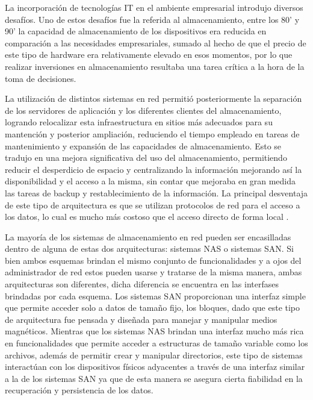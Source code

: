 \documentclass[a4paper,10pt]{article}
\begin{document}
	La incorporación de tecnologías IT en el ambiente empresarial introdujo diversos desafíos. Uno de estos desafíos fue la referida al almacenamiento, entre los 80’ y 90’ la capacidad de almacenamiento de los dispositivos era reducida en comparación a las necesidades empresariales, sumado al hecho de que el precio de este tipo de hardware era relativamente elevado en esos momentos, por lo que realizar inversiones en almacenamiento resultaba una tarea crítica a la hora de la toma de decisiones.
	
	La utilización de distintos sistemas en red permitió posteriormente la separación de los servidores de aplicación y los diferentes clientes del almacenamiento, logrando relocalizar esta infraestructura en sitios más adecuados para su mantención y posterior ampliación, reduciendo el tiempo empleado en tareas de mantenimiento y expansión de las capacidades de almacenamiento. Esto se tradujo en una mejora significativa del uso del almacenamiento, permitiendo reducir el desperdicio de espacio y centralizando la información mejorando así la disponibilidad y el acceso a la misma, sin contar que mejoraba en gran medida las tareas de backup y restablecimiento de la información. La principal desventaja de este tipo de arquitectura es que se utilizan protocolos de red para el acceso a los datos, lo cual es mucho más costoso que el acceso directo de forma local \citep{Gibson_Van_Meter_2000}.
	
	La mayoría de los sistemas de almacenamiento en red pueden ser encasilladas dentro de alguna de estas dos arquitecturas: sistemas NAS o sistemas SAN. Si bien ambos esquemas brindan el mismo conjunto de funcionalidades y a ojos del administrador de red estos pueden usarse y tratarse de la misma manera, ambas arquitecturas son diferentes, dicha diferencia se encuentra en las interfases brindadas por cada esquema. Los sistemas SAN proporcionan una interfaz simple que permite acceder solo a datos de tamaño fijo, los bloques, dado que este tipo de arquitectura fue pensada y diseñada para manejar y manipular medios magnéticos. Mientras que los sistemas NAS brindan una interfaz mucho más rica en funcionalidades que permite acceder a estructuras de tamaño variable como los archivos, además de permitir crear y manipular directorios, este tipo de sistemas interactúan con los dispositivos físicos adyacentes a través de una interfaz similar a la de los sistemas SAN ya que de esta manera se asegura cierta fiabilidad en la recuperación y persistencia de los datos.
	
\end{document}
